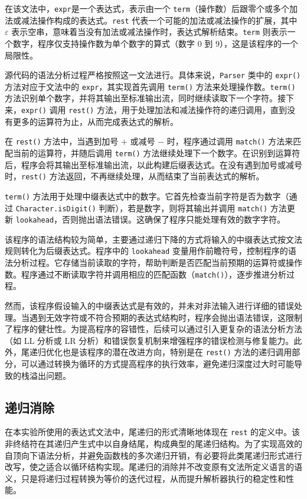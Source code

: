 \documentclass[a4paper, twoside, utf8]{ctexart}
\begin{document}
    在该文法中，\verb|expr|是一个表达式，表示由一个 \verb|term|（操作数）后跟零个或多个加法或减法操作构成的表达式。\verb|rest| 代表一个可能的加法或减法操作的扩展，其中 $\varepsilon$ 表示空串，意味着当没有加法或减法操作时，表达式解析结束。\verb|term| 则表示一个数字，程序仅支持操作数为单个数字的算式（数字 0 到 9），这是该程序的一个局限性。

    源代码的语法分析过程严格按照这一文法进行。具体来说，\verb|Parser| 类中的 \verb|expr()| 方法对应于文法中的 \verb|expr|，其实现首先调用 \verb|term()| 方法来处理操作数。\verb|term()| 方法识别单个数字，并将其输出至标准输出流，同时继续读取下一个字符。接下来，\verb|expr()| 调用 \verb|rest()| 方法，用于处理加法和减法操作符的递归调用，直到没有更多的运算符为止，从而完成表达式的解析。

    在 \verb|rest()| 方法中，当遇到加号 $+$ 或减号 $-$ 时，程序通过调用 \verb|match()| 方法来匹配当前的运算符，并随后调用 \verb|term()| 方法继续处理下一个数字。在识别到运算符后，程序会将其输出至标准输出流，以此构建后缀表达式。在没有遇到加号或减号时，\verb|rest()| 方法返回，不再继续处理，从而结束了当前表达式的解析。

    \verb|term()| 方法用于处理中缀表达式中的数字。它首先检查当前字符是否为数字（通过 \verb|Character.isDigit()| 判断），若是数字，则将其输出并调用 \verb|match()| 方法更新 \verb|lookahead|，否则抛出语法错误。这确保了程序只能处理有效的数字字符。

    该程序的语法结构较为简单，主要通过递归下降的方式将输入的中缀表达式按文法规则转化为后缀表达式。程序中的 \verb|lookahead| 变量用作前瞻符号，控制程序的语法分析过程。它存储当前读取的字符，帮助判断是否匹配当前预期的运算符或操作数。程序通过不断读取字符并调用相应的匹配函数（\verb|match()|），逐步推进分析过程。

    然而，该程序假设输入的中缀表达式是有效的，并未对非法输入进行详细的错误处理。当遇到无效字符或不符合预期的表达式结构时，程序会抛出语法错误，这限制了程序的健壮性。为提高程序的容错性，后续可以通过引入更复杂的语法分析方法（如 LL 分析或 LR 分析）和错误恢复机制来增强程序的错误检测与修复能力。此外，尾递归优化也是该程序的潜在改进方向，特别是在 \verb|rest()| 方法的递归调用部分，可以通过转换为循环的方式提高程序的执行效率，避免递归深度过大时可能导致的栈溢出问题。

    \subsection{递归消除}

    在本实验所使用的表达式文法中，尾递归的形式清晰地体现在 \verb|rest| 的定义中。该非终结符在其递归产生式中以自身结尾，构成典型的尾递归结构。为了实现高效的自顶向下语法分析，并避免函数栈的多次递归开销，有必要将此类尾递归形式进行改写，使之适合以循环结构实现。尾递归的消除并不改变原有文法所定义语言的语义，只是将递归过程转换为等价的迭代过程，从而提升解析器执行的稳定性和性能。
\end{document}
